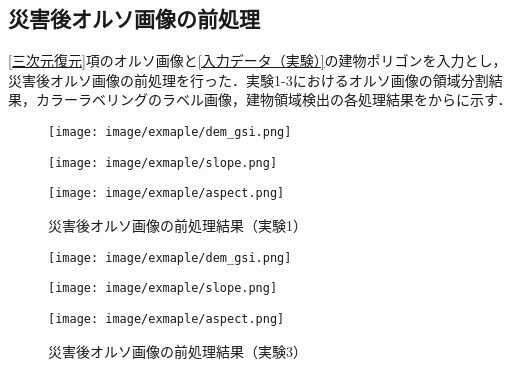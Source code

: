     \subsection{災害後オルソ画像の前処理}
      \label{災害後オルソ画像の前処理}
      \ref{三次元復元}項のオルソ画像と\ref{入力データ（実験）}の建物ポリゴンを入力とし，災害後オルソ画像の前処理を行った．実験1-3におけるオルソ画像の領域分割結果，カラーラベリングのラベル画像，建物領域検出の各処理結果をからに示す．

    \begin{figure}[t]
      \begin{minipage}[c]{0.329\hsize}
        \centering
        \texttt{[image: image/exmaple/dem\_gsi.png]}
      \end{minipage}
      \begin{minipage}[c]{0.329\hsize}
        \centering
        \texttt{[image: image/exmaple/slope.png]}
      \end{minipage}
      \begin{minipage}[c]{0.329\hsize}
        \centering
        \texttt{[image: image/exmaple/aspect.png]}
      \end{minipage}
      \caption{災害後オルソ画像の前処理結果（実験1）}
      \label{災害後オルソ画像の前処理結果（実験1）}
    \end{figure}

    \begin{figure}[t]
      \begin{minipage}[c]{0.329\hsize}
        \centering
        \texttt{[image: image/exmaple/dem\_gsi.png]}
      \end{minipage}
      \begin{minipage}[c]{0.329\hsize}
        \centering
        \texttt{[image: image/exmaple/slope.png]}
      \end{minipage}
      \begin{minipage}[c]{0.329\hsize}
        \centering
        \texttt{[image: image/exmaple/aspect.png]}
      \end{minipage}
      \caption{災害後オルソ画像の前処理結果（実験3）}      
    \end{figure}


